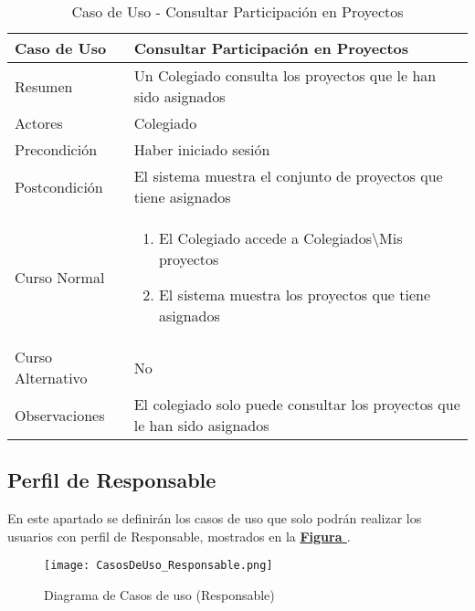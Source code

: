 \begin{table}[!htbp]
  \centering  \addtocounter{casouso}{1}
  \begin{tabular}{|l | p{100mm}|}
    \textbf{Caso de Uso}  & \textbf{Consultar Participación en Proyectos} \\ \hline
    Resumen 		 & Un Colegiado consulta los proyectos que le han sido asignados \\ \hline
    Actores  		 & Colegiado \\ \hline
    Precondición  	 & Haber iniciado sesión \\ \hline
    Postcondición  	 & El sistema muestra el conjunto de proyectos que tiene asignados \\ \hline
    Curso Normal   	 & \begin{enumerate}
	  \item El Colegiado accede a Colegiados\textbackslash Mis proyectos
	  \item El sistema muestra los proyectos que tiene asignados
    \end{enumerate}  \\ \hline
    Curso Alternativo  & No  \\ \hline
    Observaciones 	 & El colegiado solo puede consultar los proyectos que le han sido asignados \\ \hline
  \end{tabular}
  \caption{Caso de Uso  - Consultar Participación en Proyectos}
  \label{tab:cucConsultaProyectos}
\end{table}
\FloatBarrier


\subsection{Perfil de Responsable}

\addtocounter{figura}{1}
En este apartado se definirán los casos de uso que solo podrán realizar los usuarios con perfil de Responsable, mostrados en la \textbf{\hyperref[fig:CasosDeUso_Responsable]{Figura }}.

\begin{figure}[!htbp]
  \centering
  \texttt{[image: CasosDeUso\_Responsable.png]}
  \caption{Diagrama de Casos de uso (Responsable)}
  \label{fig:CasosDeUso_Responsable}
\end{figure}
\FloatBarrier


